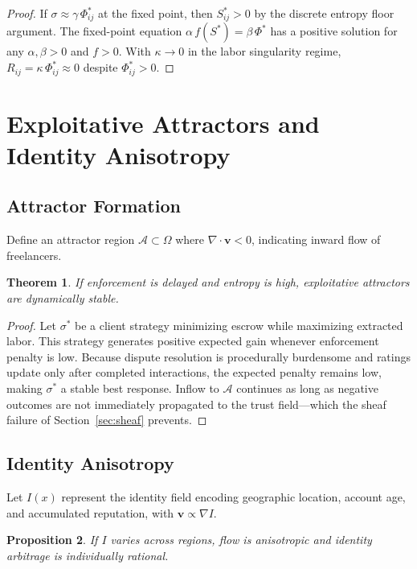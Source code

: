 \documentclass[11pt]{article}
\newtheorem{theorem}{Theorem}
\newtheorem{proposition}[theorem]{Proposition}
\begin{document}
\begin{proof}
If $\sigma \approx \gamma\,\Phi_{ij}^*$ at the fixed point, then $S_{ij}^*
> 0$ by the discrete entropy floor argument. The fixed-point equation
$\alpha\,f(S^*) = \beta\,\Phi^*$ has a positive solution for any $\alpha,
\beta > 0$ and $f > 0$. With $\kappa \to 0$ in the labor singularity regime,
$R_{ij} = \kappa\,\Phi_{ij}^* \approx 0$ despite $\Phi_{ij}^* > 0$.
\end{proof}

\section{Exploitative Attractors and Identity Anisotropy}
\label{sec:attractors}

\subsection{Attractor Formation}

Define an attractor region $\mathcal{A} \subset \Omega$ where
$\nabla \cdot \mathbf{v} < 0$, indicating inward flow of freelancers.

\begin{theorem}
If enforcement is delayed and entropy is high, exploitative attractors are
dynamically stable.
\end{theorem}

\begin{proof}
Let $\sigma^*$ be a client strategy minimizing escrow while maximizing
extracted labor. This strategy generates positive expected gain whenever
enforcement penalty is low. Because dispute resolution is procedurally
burdensome and ratings update only after completed interactions, the expected
penalty remains low, making $\sigma^*$ a stable best response. Inflow to
$\mathcal{A}$ continues as long as negative outcomes are not immediately
propagated to the trust field---which the sheaf failure of
Section~\ref{sec:sheaf} prevents.
\end{proof}

\subsection{Identity Anisotropy}

Let $I(x)$ represent the identity field encoding geographic location, account
age, and accumulated reputation, with $\mathbf{v} \propto \nabla I$.

\begin{proposition}
If $I$ varies across regions, flow is anisotropic and identity arbitrage
is individually rational.
\end{proposition}
\end{document}
